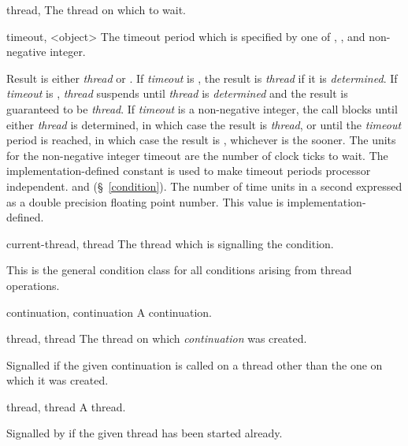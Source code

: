 \begin{optDefinition}
%
\begin{specargs}
%
    \item[thread, \classref{thread}] The thread on which to wait.
%
    \item[timeout, <object>] The timeout period which is specified by one of
    \nil{}, \true, and non-negative integer.
%
\end{specargs}
%
\result%
Result is either {\em thread} or \nil{}.  If {\em timeout} is \nil{}, the result is
{\em thread} if it is {\em determined}.  If {\em timeout} is \true, {\em thread}
suspends until {\em thread} is {\em determined} and the result is guaranteed to
be {\em thread}.  If {\em timeout} is a non-negative integer, the call blocks
until either {\em thread} is determined, in which case the result is {\em
    thread}, or until the {\em timeout} period is reached, in which case the
result is \nil{}, whichever is the sooner.  The units for the non-negative integer
timeout are the number of clock ticks to wait.  The implementation-defined
constant  is used to make timeout periods
processor independent.
%
\seealso%
 and  (\S~\ref{condition}).
%
%
The number of time units in a second expressed as a double precision floating
point number.  This value is
implementation-defined.

%
\begin{initoptions}
    \item[current-thread, thread] The thread which is signalling the condition.
\end{initoptions}
%
\remarks%
This is the general condition class for all conditions arising from
thread operations.

%
\begin{initoptions}
%
    \item[continuation, continuation] A continuation.
%
    \item[thread, thread] The thread on which {\em continuation} was created.
%
\end{initoptions}
%
\remarks%
Signalled if the given continuation is called on a thread other than
the one on which it was created.

%
\begin{initoptions}
    \item[thread, thread] A thread.
\end{initoptions}
%
\remarks%
Signalled by  if the given thread has been started
already.


\end{optDefinition}
